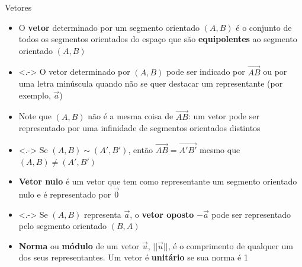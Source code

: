 \begin{frame}{Vetores}
    \begin{itemize}
        \item<+-> O \textbf{vetor} determinado por um segmento orientado \((A,B)\) é o conjunto de todos os segmentos orientados
            do espaço que são \textbf{equipolentes} ao segmento orientado \((A,B)\)
        \item<.-> O vetor determinado por \((A,B)\) pode ser indicado por \(\vec{AB}\) ou por uma letra minúscula quando não se
            quer destacar um representante (por exemplo, \(\vec{a}\))
        \item<+-> Note que \((A,B)\) não é a mesma coisa de \(\vec{AB}\): um vetor pode ser representado por uma infinidade
            de segmentos orientados distintos
        \item<.-> Se \((A,B) \sim (A',B')\), então \(\vec{AB} = \vec{A'B'}\) mesmo que \((A,B) \neq (A',B')\)
        \item<+-> \textbf{Vetor nulo} é um vetor que tem como representante um  segmento orientado nulo e
            é representado por \(\vec{0}\)
        \item<.-> Se \((A,B)\) representa \(\vec{a}\), o \textbf{vetor oposto} \(-\vec{a}\) pode ser representado pelo
            segmento orientado \((B,A)\)
        \item<+-> \textbf{Norma} ou \textbf{módulo} de um vetor \(\vec{u}\), \(||\vec{u}||\), é o comprimento de qualquer um dos
            seus representantes. Um vetor é \textbf{unitário} se sua norma é 1
    \end{itemize}
\end{frame}

